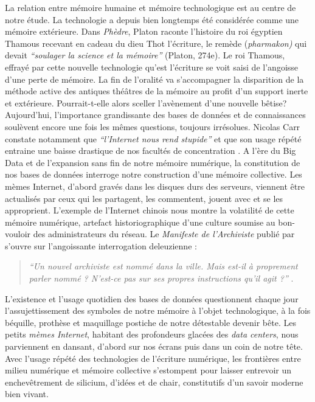 La relation entre mémoire humaine et mémoire technologique est au centre de notre étude. La technologie a depuis bien longtemps été considérée comme une mémoire extérieure. Dans \textit{Phèdre}, Platon raconte l{\textquoteright}histoire du roi égyptien Thamous recevant en cadeau du dieu Thot l{\textquoteright}écriture, le remède (\textit{pharmakon) }qui devait \textit{{\textquotedblleft}soulager la science et la mémoire{\textquotedblright} }(Platon, 274e). Le roi Thamous, effrayé par cette nouvelle technologie qu'est l'écriture se voit saisi de l{\textquoteright}angoisse d{\textquoteright}une perte de mémoire. La fin de l'oralité va s'accompagner la disparition de la méthode active des antiques thé\^atres de la mémoire au profit d{\textquoteright}un support inerte et extérieure. Pourrait-t-elle alors sceller l{\textquoteright}avènement d{\textquoteright}une nouvelle bêtise? Aujourd{\textquoteright}hui, l{\textquoteright}importance grandissante des bases de données et de connaissances soulèvent encore une fois les mêmes questions, toujours irrésolues. Nicolas Carr constate notamment que \textit{{\textquotedblleft}l{\textquoteright}Internet nous rend stupide{\textquotedblright}} et que son usage répété entraine une baisse drastique de nos facultés de concentration \citep{Carr2010}. A l{\textquoteright}ère du Big Data et de l{\textquoteright}expansion sans fin de notre mémoire numérique, la constitution de nos bases de données interroge notre construction d{\textquoteright}une mémoire collective. Les mèmes Internet, d{\textquoteright}abord gravés dans les disques durs des serveurs, viennent être actualisés par ceux qui les partagent, les commentent, jouent avec et se les approprient. L{\textquoteright}exemple de l{\textquoteright}Internet chinois nous montre la volatilité de cette mémoire numérique, artefact historiographique d{\textquoteright}une culture soumise au bon-vouloir des administrateurs du réseau. Le \textit{Manifeste de l{\textquoteright}Archiviste} publié par \cite{Hui2014} s{\textquoteright}ouvre sur l{\textquoteright}angoissante interrogation deleuzienne :  

\begin{quote}
\textit{
    ``Un nouvel archiviste est nommé dans la ville. Mais est-il à proprement parler nommé ? N'est-ce pas sur ses propres instructions qu'il agit ?''
}
\citep{Deleuze1972a}.
\end{quote}

L{\textquoteright}existence et l{\textquoteright}usage quotidien des bases de données questionnent chaque jour l{\textquoteright}assujettissement des symboles de notre mémoire à l{\textquoteright}objet technologique, à la fois béquille, prothèse et maquillage postiche de notre détestable devenir bête. Les petits \textit{mèmes Internet}, habitant des profondeurs glacées des \textit{data centers}, nous parviennent en dansant, d{\textquoteright}abord sur nos écrans puis dans un coin de notre tête. Avec l{\textquoteright}usage répété des technologies de l{\textquoteright}écriture numérique, les frontières entre milieu numérique et mémoire collective s{\textquoteright}estompent pour laisser entrevoir un enchevêtrement de silicium, d{\textquoteright}idées et de chair, constitutifs d'un savoir moderne bien vivant.

